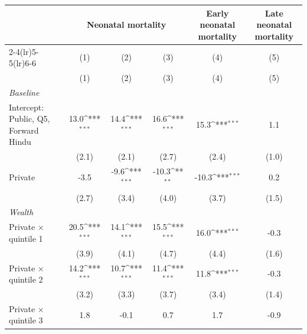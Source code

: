 {
\def\sym#1{\ifmmode^{#1}\else\(^{#1}\)\fi}
\begin{tabular}{l*{5}{c}}
\toprule
            &\multicolumn{3}{c}{Neonatal mortality}                           &\multicolumn{1}{c}{Early neonatal mortality}&\multicolumn{1}{c}{Late neonatal mortality}\\\cmidrule(lr){2-4}\cmidrule(lr){5-5}\cmidrule(lr){6-6}
            &\multicolumn{1}{c}{(1)}&\multicolumn{1}{c}{(2)}&\multicolumn{1}{c}{(3)}&\multicolumn{1}{c}{(4)}&\multicolumn{1}{c}{(5)}\\
            &\multicolumn{1}{c}{(1)}&\multicolumn{1}{c}{(2)}&\multicolumn{1}{c}{(3)}&\multicolumn{1}{c}{(4)}&\multicolumn{1}{c}{(5)}\\
\midrule
\textit{Baseline}&                     &                     &                     &                     &                     \\
\addlinespace
Intercept: Public, Q5, Forward Hindu&        13.0\sym{***}&        14.4\sym{***}&        16.6\sym{***}&        15.3\sym{***}&         1.1         \\
            &       (2.1)         &       (2.1)         &       (2.7)         &       (2.4)         &       (1.0)         \\
\addlinespace
Private     &        -3.5         &        -9.6\sym{***}&       -10.3\sym{**} &       -10.3\sym{***}&         0.2         \\
            &       (2.7)         &       (3.4)         &       (4.0)         &       (3.7)         &       (1.5)         \\
\addlinespace
\textit{Wealth}&                     &                     &                     &                     &                     \\
\addlinespace
Private $\times$ quintile 1&        20.5\sym{***}&        14.1\sym{***}&        15.5\sym{***}&        16.0\sym{***}&        -0.3         \\
            &       (3.9)         &       (4.1)         &       (4.7)         &       (4.4)         &       (1.6)         \\
\addlinespace
Private $\times$ quintile 2&        14.2\sym{***}&        10.7\sym{***}&        11.4\sym{***}&        11.8\sym{***}&        -0.3         \\
            &       (3.2)         &       (3.3)         &       (3.7)         &       (3.4)         &       (1.4)         \\
\addlinespace
Private $\times$ quintile 3&         1.8         &        -0.1         &         0.7         &         1.7         &        -0.9         \\

\end{tabular}}
